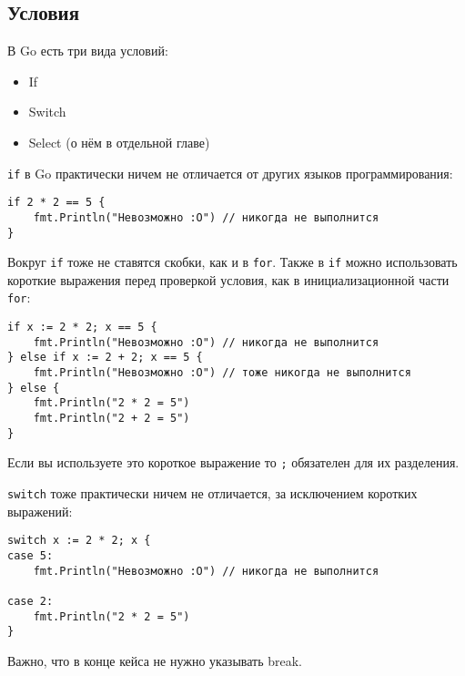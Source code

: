 \subsection{Условия}
В Go есть три вида условий:
\begin{itemize}
    \item If
    \item Switch
    \item Select (о нём в отдельной главе)
\end{itemize}

\verb|if| в Go практически ничем не отличается от других языков программирования:
\begin{verbatim}
if 2 * 2 == 5 {
    fmt.Println("Невозможно :O") // никогда не выполнится
}
\end{verbatim}
\noindent Вокруг \verb|if| тоже не ставятся скобки, как и в \verb|for|.
\noindent Также в \verb|if| можно использовать короткие выражения перед проверкой условия, как в инициализационной части \verb|for|:
\begin{verbatim}
if x := 2 * 2; x == 5 {
    fmt.Println("Невозможно :O") // никогда не выполнится
} else if x := 2 + 2; x == 5 {
    fmt.Println("Невозможно :O") // тоже никогда не выполнится
} else {
    fmt.Println("2 * 2 = 5")
    fmt.Println("2 + 2 = 5")
}
\end{verbatim}
\noindent Если вы используете это короткое выражение то \verb|;| обязателен для их разделения.

\verb|switch| тоже практически ничем не отличается, за исключением коротких выражений:
\begin{verbatim}
switch x := 2 * 2; x {
case 5:
    fmt.Println("Невозможно :O") // никогда не выполнится

case 2:
    fmt.Println("2 * 2 = 5")
}
\end{verbatim}
\noindent Важно, что в конце кейса не нужно указывать break.
